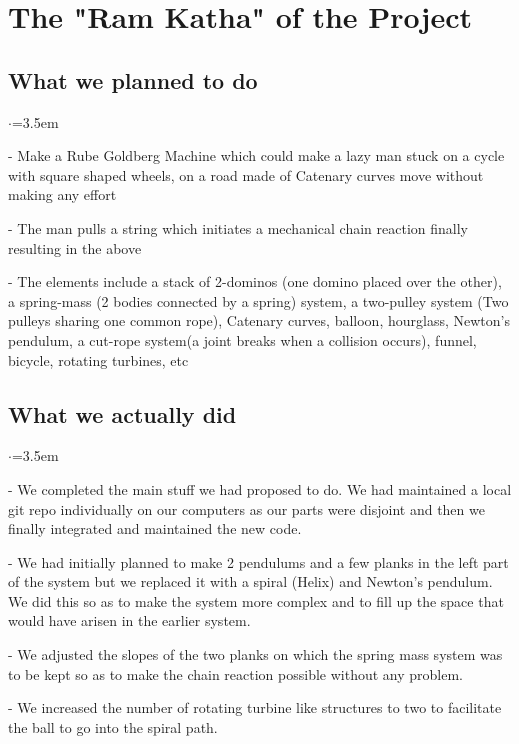 \documentclass[12pt, a4paper]{article}
\begin{document}
\pagebreak
\section{The "Ram Katha" of the Project}

\subsection{What we planned to do}
\begin{list}{$\cdot$}{\leftmargin=3.5em}
\item[-] {Make a Rube Goldberg Machine which could make a lazy man stuck on a cycle with square shaped wheels, on a road made of Catenary curves move without making any effort}
\item[-] {The man pulls a string which initiates a mechanical chain reaction finally resulting in the above}
\item[-] {The elements include a stack of 2-dominos (one domino placed over the other), a spring-mass (2 bodies connected by a spring) system, a two-pulley system (Two pulleys sharing one common rope), Catenary curves, balloon, hourglass, Newton's pendulum, a cut-rope system(a joint breaks when a collision occurs), funnel, bicycle, rotating turbines, etc }
\end{list}


\subsection{What we actually did}
\begin{list}{$\cdot$}{\leftmargin=3.5em}
\item[-] {We completed the main stuff we had proposed to do. We had maintained a local git repo individually on our computers as our parts were disjoint and then we finally integrated and maintained the new code.}
\item[-] {We had initially planned to make 2 pendulums and a few planks in the left part of the system but we replaced it with a spiral (Helix) and Newton's pendulum. We did this so as to make the system more complex and to fill up the space that would have arisen in the earlier system.}
\item[-] {We adjusted the slopes of the two planks on which the spring mass system was to be kept so as to make the chain reaction possible without any problem.}
\item[-] {We increased the number of rotating turbine like structures to two to facilitate the ball to go into the spiral path.} 
\end{list}
\end{document}
